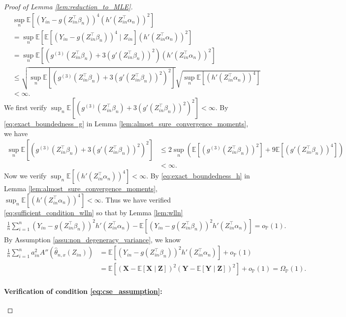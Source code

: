 \documentclass[12pt]{article}
\theoremstyle{definition}
\def\P{\mathbb{P}}
\def\P{\mathbb{P}}
\newcommand{\E}{\mathbb E}								%
\renewcommand{\P}{\mathbb{P}}							%
\newcommand{\prx}{\bm X}								%
\newcommand{\prz}{\bm Z}								%
\newcommand{\srz}{Z}									%
\newcommand{\pry}{{\bm Y}}								%
\newcommand{\sry}{Y}									%
\begin{document}
\begin{proof}[Proof of Lemma \ref{lem:reduction_to_MLE}]
\begin{align*}
      &
      \sup_n \E[(\sry_{in}-g(\srz_{in}^\top \beta_n))^4(h'(\srz_{in}^\top \alpha_n))^2]\\
      &
      =\sup_n\E[\E[(\sry_{in}-g(\srz_{in}^\top \beta_n))^4\mid \srz_{in}](h'(\srz_{in}^\top \alpha_n))^2]\\
      &
      =\sup_n\E[(g^{(3)}(\srz_{in}^\top\beta_n)+3(g'(\srz_{in}^\top \beta_n))^2)(h'(\srz_{in}^\top \alpha_n))^2]\\
      &
      \leq \sqrt{\sup_n\E[(g^{(3)}(\srz_{in}^\top\beta_n)+3(g'(\srz_{in}^\top \beta_n))^2)^2]}\sqrt{\sup_n\E[(h'(\srz_{in}^\top \alpha_n))^4]}\\
      &
      <\infty.
    \end{align*}
    We first verify $\sup_n\E[(g^{(3)}(\srz_{in}^\top\beta_n)+3(g'(\srz_{in}^\top \beta_n))^2)^2]<\infty$. By \eqref{eq:exact_boundedness_g} in Lemma \ref{lem:almost_sure_convergence_moments}, we have 
    \begin{align*}
      \sup_n\E[(g^{(3)}(\srz_{in}^\top\beta_n)+3(g'(\srz_{in}^\top \beta_n))^2)^2]
      &
      \leq 2\sup_n(\E[(g^{(3)}(\srz_{in}^\top\beta_n))^2]+9\E[(g'(\srz_{in}^\top \beta_n))^4])\\
      & 
      <\infty.
    \end{align*}
    Now we verify $\sup_n\E[(h'(\srz_{in}^\top \alpha_n))^4]<\infty$. By \eqref{eq:exact_boundedness_h} in Lemma \ref{lem:almost_sure_convergence_moments}, $\sup_n\E[(h'(\srz_{in}^\top \alpha_n))^4]<\infty$. Thus we have verified \eqref{eq:sufficient_condition_wlln} so that by Lemma \ref{lem:wlln}
    \begin{align*}
      \frac{1}{n}\sum_{i=1}^n (\sry_{in}-g(\srz_{in}^\top \beta_n))^2h'(\srz_{in}^\top \alpha_n)-\E[(\sry_{in}-g(\srz_{in}^\top \beta_n))^2h'(\srz_{in}^\top \alpha_n)]=o_{\P}(1).
    \end{align*}
    By Assumption \ref{assu:non_degeneracy_variance}, we know 
    \begin{align*}
      \frac{1}{n}\sum_{i=1}^n a_{in}^2A''(\widehat \theta_{n,x}(\srz_{in}))
      &
      =\E[(\sry_{in}-g(\srz_{in}^\top \beta_n))^2h'(\srz_{in}^\top \alpha_n)]+o_{\P}(1)\\
      &
      =\E[(\prx-\E[\prx\mid\prz])^2(\pry-\E[\pry\mid\prz])^2]+o_{\P}(1)=\Omega_{\P}(1).
    \end{align*}
    
    \paragraph{Verification of condition \eqref{eq:cse_assumption}:}


\end{proof}
\end{document}
